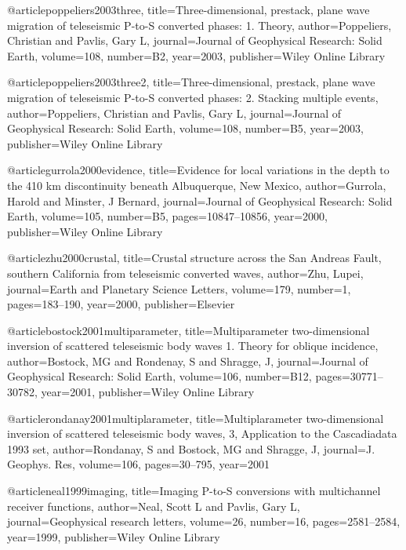 @article{poppeliers2003three,
  title={Three-dimensional, prestack, plane wave migration of teleseismic P-to-S converted phases: 1. Theory},
  author={Poppeliers, Christian and Pavlis, Gary L},
  journal={Journal of Geophysical Research: Solid Earth},
  volume={108},
  number={B2},
  year={2003},
  publisher={Wiley Online Library}
}

@article{poppeliers2003three2,
  title={Three-dimensional, prestack, plane wave migration of teleseismic P-to-S converted phases: 2. Stacking multiple events},
  author={Poppeliers, Christian and Pavlis, Gary L},
  journal={Journal of Geophysical Research: Solid Earth},
  volume={108},
  number={B5},
  year={2003},
  publisher={Wiley Online Library}
}

@article{gurrola2000evidence,
  title={Evidence for local variations in the depth to the 410 km discontinuity beneath Albuquerque, New Mexico},
  author={Gurrola, Harold and Minster, J Bernard},
  journal={Journal of Geophysical Research: Solid Earth},
  volume={105},
  number={B5},
  pages={10847--10856},
  year={2000},
  publisher={Wiley Online Library}
}


@article{zhu2000crustal,
  title={Crustal structure across the San Andreas Fault, southern California from teleseismic converted waves},
  author={Zhu, Lupei},
  journal={Earth and Planetary Science Letters},
  volume={179},
  number={1},
  pages={183--190},
  year={2000},
  publisher={Elsevier}
}

@article{bostock2001multiparameter,
  title={Multiparameter two-dimensional inversion of scattered teleseismic body waves 1. Theory for oblique incidence},
  author={Bostock, MG and Rondenay, S and Shragge, J},
  journal={Journal of Geophysical Research: Solid Earth},
  volume={106},
  number={B12},
  pages={30771--30782},
  year={2001},
  publisher={Wiley Online Library}
}


@article{rondanay2001multiplarameter,
  title={Multiplarameter two-dimensional inversion of scattered teleseismic body waves, 3, Application to the Cascadiadata 1993 set},
  author={Rondanay, S and Bostock, MG and Shragge, J},
  journal={J. Geophys. Res},
  volume={106},
  pages={30--795},
  year={2001}
}



@article{neal1999imaging,
  title={Imaging P-to-S conversions with multichannel receiver functions},
  author={Neal, Scott L and Pavlis, Gary L},
  journal={Geophysical research letters},
  volume={26},
  number={16},
  pages={2581--2584},
  year={1999},
  publisher={Wiley Online Library}
}



